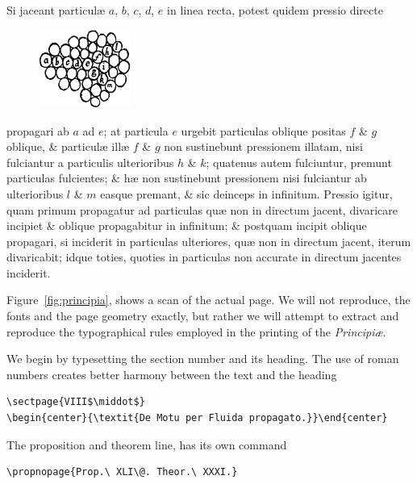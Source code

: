 Si jaceant particul{\ae} $a$, $b$, $c$, $d$, $e$ in linea recta, potest quidem
pressio directe

\begin{figure}
  \vspace{-17pt}
  \includegraphics[width=0.27\textwidth]{images/362.png}
\end{figure}

\noindent propagari  ab $a$ ad $e$; at
particula $e$ urgebit particulas oblique positas
$f$ \& $g$ oblique, \& particul{\ae} ill{\ae} $f$ \& $g$
non sustinebunt pressionem illatam, nisi fulciantur
a particulis ulterioribus $h$ \& $k$;
quatenus autem fulciuntur, premunt particulas
fulcientes; \& h{\ae} non sustinebunt pressionem nisi fulciantur
ab ulterioribus $l$ \& $m$ easque premant, \& sic deinceps in infinitum.
Pressio igitur, quam primum propagatur ad particulas
qu{\ae} non in directum jacent, divaricare incipiet \& oblique propagabitur
in infinitum; \& postquam incipit oblique propagari, si
inciderit in particulas ulteriores, qu{\ae} non in directum jacent, iterum
divaricabit; idque toties, quoties in particulas non accurate
in directum jacentes inciderit. \QEDit

\topline

\vspace*{-\baselineskip}
\egroup
\smallskip
Figure~\ref{fig:principia}, shows a scan of the actual page. We will not reproduce, the fonts and the page geometry exactly, but rather we will attempt to extract and reproduce the typographical rules employed in the printing of the \textit{Principi\ae}.

We begin by typesetting the section number and its heading. The use of roman numbers creates better harmony between the text and the heading
\begin{verbatim}
\sectpage{VIII$\middot$}
\begin{center}{\textit{De Motu per Fluida propagato.}}\end{center}
\end{verbatim}
The proposition and theorem line, has its own command
\begin{verbatim}
\propnopage{Prop.\ XLI\@. Theor.\ XXXI.}
\end{verbatim}

